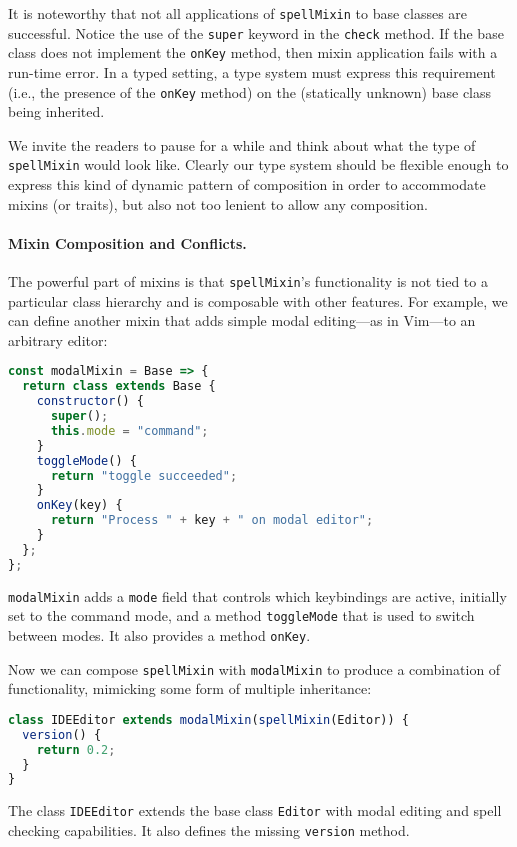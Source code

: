It is noteworthy that not all applications of \lstinline{spellMixin} to base
classes are successful. Notice the use of the \lstinline{super} keyword in the
\lstinline{check} method. If the base class does not implement the
\lstinline{onKey} method, then mixin application fails with a run-time error. In
a typed setting, a type system must express this requirement (i.e., the presence of
the \lstinline{onKey} method) on the (statically unknown) base class being inherited.




We invite the readers to pause for a while and think about what the type of
\lstinline{spellMixin} would look like. Clearly our type system should be
flexible enough to express this kind of dynamic pattern of composition in order
to accommodate mixins (or traits), but also not too lenient to allow any
composition.


\paragraph{Mixin Composition and Conflicts.}
The powerful part of mixins is that \lstinline{spellMixin}'s functionality is not
tied to a particular class hierarchy and is composable with other features. For
example, we can define another mixin that adds simple modal editing---as in Vim---to an arbitrary editor:
\begin{lstlisting}[language=JavaScript]
const modalMixin = Base => {
  return class extends Base {
    constructor() {
      super();
      this.mode = "command";
    }
    toggleMode() {
      return "toggle succeeded";
    }
    onKey(key) {
      return "Process " + key + " on modal editor";
    }
  };
};
\end{lstlisting}
\lstinline{modalMixin} adds a \lstinline{mode} field that controls which
keybindings are active, initially set to the command mode, and a method
\lstinline{toggleMode} that is used to switch between modes. It also provides a method \lstinline{onKey}.

Now we can compose \lstinline{spellMixin} with \lstinline{modalMixin} to produce
a combination of functionality, mimicking some form of multiple inheritance:
\begin{lstlisting}[language=JavaScript]
class IDEEditor extends modalMixin(spellMixin(Editor)) {
  version() {
    return 0.2;
  }
}
\end{lstlisting}
The class \lstinline{IDEEditor} extends the base class \lstinline{Editor} with
modal editing and spell checking capabilities. It also defines the missing
\lstinline{version} method.

